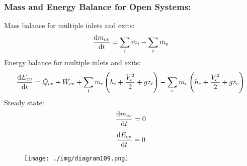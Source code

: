 \subsubsection{Mass and Energy Balance for Open Systems:}
Mass balance for multiple inlets and exits:
\begin{gather}
  \frac{\dif m_{cv}}{\dif t} = \sum_{i}\dot{m}_i - \sum_{e}\dot{m}_e
\end{gather}
Energy balance for multiple inlets and exits:
\begin{gather}
  \frac{\dif E_{cv}}{\dif t} = \dot{Q}_{cv} + \dot{W}_{cv} + \sum_{i}\dot{m}_i\left(h_i + \frac{V_i^2}{2} + gz_i\right) - \sum_{e}\dot{m}_e\left(h_e + \frac{V_e^2}{2} + gz_e\right)
\end{gather}
Steady state:
\begin{gather}
  \frac{\dif m_{cv}}{\dif t} = 0 \\[5pt]
  \frac{\dif E_{cv}}{\dif t} = 0
\end{gather}
\begin{figure}[H]
  \centering
  \texttt{[image: ./img/diagram109.png]}
  \caption{}
\end{figure}
